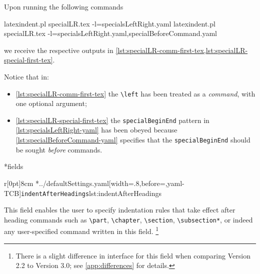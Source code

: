 	Upon running the following commands \begin{widepage} \begin{commandshell}
latexindent.pl specialLR.tex -l=specialsLeftRight.yaml      
latexindent.pl specialLR.tex -l=specialsLeftRight.yaml,specialBeforeCommand.yaml      
    \end{commandshell} \end{widepage} we receive the respective outputs in \cref{lst:specialLR-comm-first-tex,lst:specialLR-special-first-tex}.

	\begin{minipage}{.49\linewidth}
	\end{minipage}
	\hfill
	\begin{minipage}{.49\linewidth}
	\end{minipage}

	Notice that in: \begin{itemize} \item \cref{lst:specialLR-comm-first-tex} the \lstinline!\left! has been treated as a \emph{command}, with one optional argument;
		\item \cref{lst:specialLR-special-first-tex} the \texttt{specialBeginEnd} pattern in \cref{lst:specialsLeftRight-yaml} has been obeyed because \cref{lst:specialBeforeCommand-yaml} specifies that the \texttt{specialBeginEnd} should be sought \emph{before} commands.
	\end{itemize}

*{fields}
	\begin{wrapfigure}[17]{r}[0pt]{8cm}
		\cmhlistingsfromfile[style=indentAfterHeadings]*{../defaultSettings.yaml}[width=.8\linewidth,before=\centering,yaml-TCB]{\texttt{indentAfterHeadings}}{lst:indentAfterHeadings}
	\end{wrapfigure}
	This field enables the user to specify indentation rules that take effect after heading commands such as \lstinline!\part!, \lstinline!\chapter!, \lstinline!\section!, \lstinline!\subsection*!, or indeed any user-specified command written in this field.
	\footnote{There is a slight
		difference in interface for this field when comparing Version 2.2 to Version 3.0; see \vref{app:differences} for details.}


